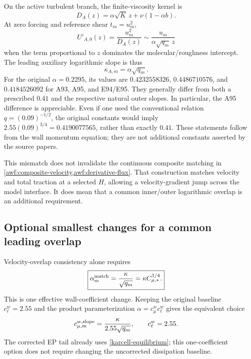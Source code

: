 \documentclass[11pt,a4paper]{article}
\numberwithin{equation}{section}
\begin{document}
On the active turbulent branch, the finite-viscosity kernel is
\begin{equation}
 D_A(z)=\alpha\sqrt K\,z+\nu(1-\alpha b).
 \label{kap:active-D}
\end{equation}
At zero forcing and reference shear $t_m=u_m^2$,
\begin{equation}
 U'_{A,0}(z)=\frac{u_m^2}{D_A(z)}
 \sim\frac{u_m}{\alpha\sqrt{q_m}\,z}
\end{equation}
when the term proportional to $z$ dominates the molecular/roughness
intercept. The leading auxiliary logarithmic slope is thus
\begin{equation}
 \boxed{\kappa_{A,m}=\alpha\sqrt{q_m}}.
 \label{kap:auxiliary-kappa}
\end{equation}
For the original $\alpha=0.2295$, its values are
$0.4232558326$, $0.4486710576$, and $0.4184526092$
for A93, A95, and E94/E95. They generally differ from both a prescribed
$0.41$ and the respective natural outer slopes. In particular, the
A95 difference is appreciable.
Even if one used the conventional relation
$q=(0.09)^{-1/2}$, the original constants would imply
$2.55(0.09)^{3/4}=0.4190077565$, rather than exactly $0.41$.
These statements follow from the wall momentum equation; they are
not additional constants asserted by the source papers.

This mismatch does not invalidate the continuous composite matching
in \cref{awf:composite-velocity,awf:derivative-flux}. That construction
matches velocity and total traction at a selected $H$, allowing a
velocity-gradient jump across the model interface.
It does mean that a common inner/outer logarithmic overlap is an
additional requirement.

\subsection{Optional smallest changes for a common leading overlap}
\label{kap:slope-option}

Velocity-overlap consistency alone requires
\begin{equation}
 \boxed{\alpha_m^{\rm match}=\frac{\kappa}{\sqrt{q_m}}
 =\kappa C_{\mu,*}^{1/4}.}
 \label{kap:slope-match}
\end{equation}
This is one effective wall-coefficient change. Keeping the original
baseline $c_\ell^w=2.55$ and the product parameterization
$\alpha=c_\mu^wc_\ell^w$ gives the equivalent choice
\begin{equation}
 c_{\mu,m}^{w,\rm slope}=\frac{\kappa}{2.55\sqrt{q_m}},
 \qquad c_\ell^w=2.55.
 \label{kap:one-coefficient}
\end{equation}
The corrected EP tail already uses \cref{kap:ell-equilibrium}; this
one-coefficient option does not require changing the uncorrected
dissipation baseline.
\end{document}
